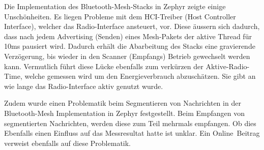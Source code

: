 Die Implementation des Bluetooth-Mesh-Stacks in Zephyr zeigte einige Unschönheiten. Es liegen Probleme mit dem HCI-Treiber (Host Controller Interface), welcher das Radio-Interface ansteuert, vor. Diese äussern sich dadurch, dass nach jedem Advertising (Senden) eines Mesh-Pakets  der aktive Thread für 10ms pausiert wird. Dadurch erhält die Abarbeitung des Stacks eine gravierende Verzögerung, bis wieder in den Scanner (Empfangs) Betrieb gewechselt werden kann. Vermutlich führt diese Lücke ebenfalls zum verkürzen der Aktive-Radio-Time, welche gemessen wird um den Energieverbrauch abzuschätzen. Sie gibt an wie lange das Radio-Interface aktiv genutzt wurde. 

Zudem wurde einen Problematik beim Segmentieren von Nachrichten in der Bluetooth-Mesh Implementation in Zephyr festgestellt. Beim Empfangen von segmentierten Nachrichten, werden diese zum Teil mehrmals empfangen. Ob dies Ebenfalls einen Einfluss auf das Messresultat hatte ist unklar. Ein Online\footnotemark\ Beitrag verweist ebenfalls auf diese Problematik. 




